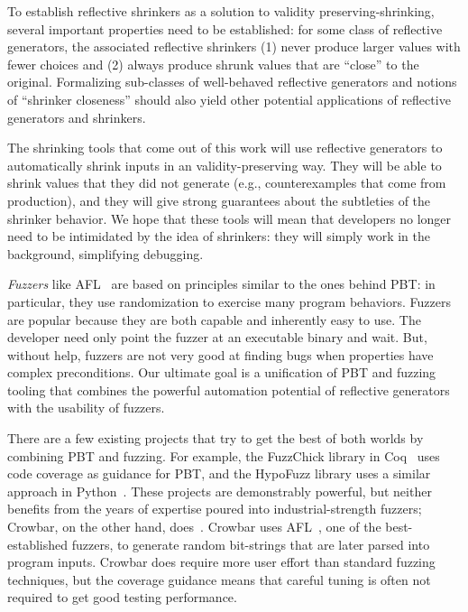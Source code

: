 To establish reflective shrinkers as a solution to
validity preserving-shrinking, several important
properties need to be established: for some class of reflective
generators, the associated reflective shrinkers (1) never produce larger values
with fewer choices and (2) always produce shrunk values that are ``close'' to
the original. Formalizing sub-classes of well-behaved reflective generators and
notions of ``shrinker closeness'' should also yield
other potential applications of reflective generators and shrinkers.

The shrinking tools that come out of this work will use reflective generators to
automatically shrink inputs in an validity-preserving way. They will be able to
shrink values that they did not generate (e.g., counterexamples that come from
production), and they will give strong guarantees about the subtleties of the
shrinker behavior. We hope that these tools will mean that developers no longer
need to be intimidated by the idea of shrinkers: they will simply work in the
background, simplifying debugging.

{\em Fuzzers} like AFL~\cite{afl-readme} are based on principles
similar to the
ones behind PBT: in particular, they use randomization to exercise many
program behaviors. Fuzzers are popular because they are both capable and
inherently easy to use. The developer need only point the fuzzer at an
executable binary and
wait. But, without help, fuzzers are not very good at finding
bugs when properties have complex preconditions.
Our ultimate goal is a unification of PBT and fuzzing tooling that combines the
powerful automation potential of reflective generators with the usability of
fuzzers.

There are a few existing projects that try to get the best of both worlds by
combining PBT and fuzzing.
For example, the FuzzChick library in Coq~\cite{OLDlampropoulos19fuzzchick}
uses code coverage as guidance for PBT, and the HypoFuzz library uses a
similar approach in Python~\cite{hatfield-dodds_hypofuzz_nodate}. These projects
are demonstrably powerful, but neither benefits from the years of expertise
poured into industrial-strength fuzzers; Crowbar, on the other hand,
does~\cite{dolan2017testing}. Crowbar uses
AFL~\cite{afl-readme}, one of the best-established
fuzzers, to generate random bit-strings that are later parsed into program
inputs. Crowbar does require more user effort than standard fuzzing techniques,
but the coverage guidance means that careful tuning is often not required to get
good testing performance.

